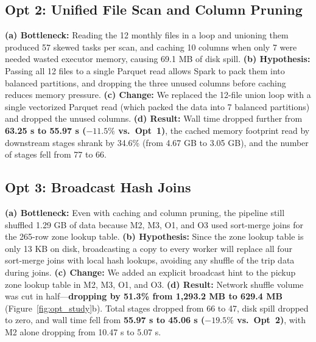 \documentclass[sigconf,nonacm]{acmart}
\begin{document}
\subsection{Opt 2: Unified File Scan and Column Pruning}
\textbf{(a) Bottleneck:} Reading the 12 monthly files in a loop and unioning them produced 57 skewed tasks per scan, and caching 10 columns when only 7 were needed wasted executor memory, causing 69.1 MB of disk spill.
\textbf{(b) Hypothesis:} Passing all 12 files to a single Parquet read allows Spark to pack them into balanced partitions, and dropping the three unused columns before caching reduces memory pressure.
\textbf{(c) Change:} We replaced the 12-file union loop with a single vectorized Parquet read (which packed the data into 7 balanced partitions) and dropped the unused columns.
\textbf{(d) Result:} Wall time dropped further from \textbf{63.25 s to 55.97 s ($-11.5\%$ vs.\ Opt~1)}, the cached memory footprint read by downstream stages shrank by 34.6\% (from 4.67 GB to 3.05 GB), and the number of stages fell from 77 to 66.

\subsection{Opt 3: Broadcast Hash Joins}
\textbf{(a) Bottleneck:} Even with caching and column pruning, the pipeline still shuffled 1.29 GB of data because M2, M3, O1, and O3 used sort-merge joins for the 265-row zone lookup table.
\textbf{(b) Hypothesis:} Since the zone lookup table is only 13 KB on disk, broadcasting a copy to every worker will replace all four sort-merge joins with local hash lookups, avoiding any shuffle of the trip data during joins.
\textbf{(c) Change:} We added an explicit broadcast hint to the pickup zone lookup table in M2, M3, O1, and O3.
\textbf{(d) Result:} Network shuffle volume was cut in half---\textbf{dropping by 51.3\% from 1,293.2 MB to 629.4 MB} (Figure~\ref{fig:opt_study}b). Total stages dropped from 66 to 47, disk spill dropped to zero, and wall time fell from \textbf{55.97 s to 45.06 s ($-19.5\%$ vs.\ Opt~2)}, with M2 alone dropping from 10.47 s to 5.07 s.
\end{document}
